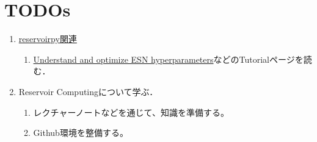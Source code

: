\section{TODOs}
\begin{enumerate}
  \item \href{https://github.com/reservoirpy/reservoirpy}{reservoirpy関連}
  \begin{enumerate}
  \item \href{https://github.com/reservoirpy/reservoirpy/blob/master/tutorials/4-Understand_and_optimize_hyperparameters.ipynb}{Understand and optimize ESN hyperparameters}などのTutorialページを読む．
  \end{enumerate}
  \item Reservoir Computingについて学ぶ．\begin{enumerate}
    \item レクチャーノートなどを通じて、知識を準備する。
    \item Github環境を整備する。
  \end{enumerate}
\end{enumerate}